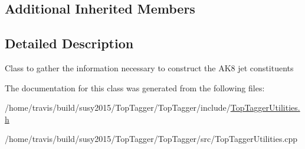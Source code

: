\subsection*{Additional Inherited Members}


\subsection{Detailed Description}
Class to gather the information necessary to construct the A\-K8 jet constituents 

The documentation for this class was generated from the following files\-:\begin{DoxyCompactItemize}
\item 
/home/travis/build/susy2015/\-Top\-Tagger/\-Top\-Tagger/include/\hyperlink{TopTaggerUtilities_8h}{Top\-Tagger\-Utilities.\-h}\item 
/home/travis/build/susy2015/\-Top\-Tagger/\-Top\-Tagger/src/Top\-Tagger\-Utilities.\-cpp\end{DoxyCompactItemize}
